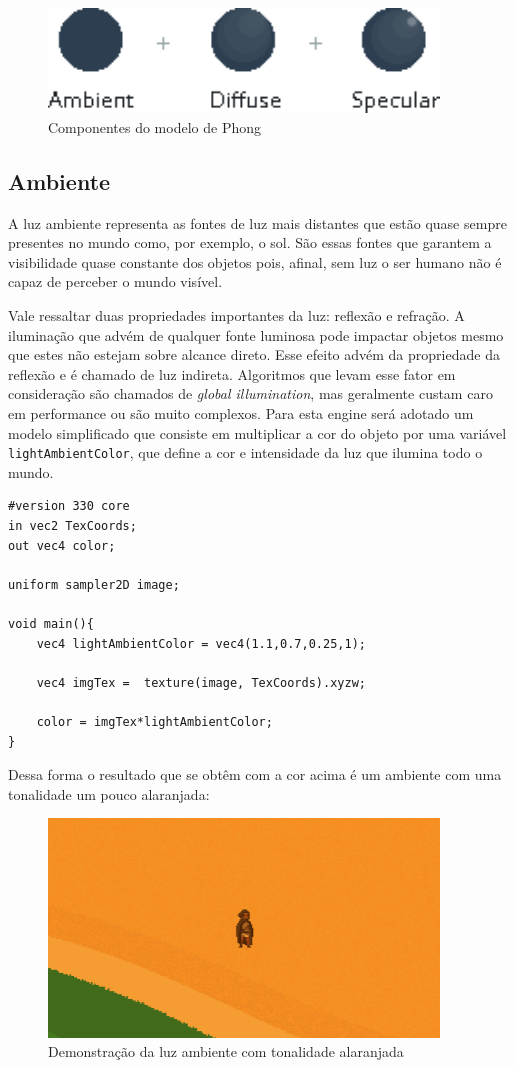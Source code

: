\documentclass[12pt, 
openright, 
oneside, 
a4paper,    
brazil]{facom-ufu-abntex2}
\begin{document}
\begin{figure}[H]
	\centering
	\includegraphics[width=28em]{imagens/lightning.png}
	\caption{Componentes do modelo de Phong}
\end{figure}


\subsection{Ambiente}
A luz ambiente representa as fontes de luz mais distantes que estão quase sempre presentes no mundo como, por exemplo, o sol. São essas fontes que garantem a visibilidade quase constante dos objetos pois, afinal, sem luz o ser humano não é capaz de perceber o mundo visível.

Vale ressaltar duas propriedades importantes da luz: reflexão e refração. A iluminação que advém de qualquer fonte luminosa pode impactar objetos mesmo que estes não estejam sobre alcance direto. Esse efeito advém da propriedade da reflexão e é chamado de luz indireta. Algoritmos que levam esse fator em consideração são chamados de \textit{global illumination}, mas geralmente custam caro em performance ou são muito complexos.
Para esta engine será adotado um modelo simplificado que consiste em multiplicar a cor do objeto por uma variável \texttt{lightAmbientColor}, que define a cor e intensidade da luz que ilumina todo o mundo.

\begin{lstlisting}[caption=Fragment Shader com luz ambiente]
#version 330 core
in vec2 TexCoords;
out vec4 color;

uniform sampler2D image;

void main(){
	vec4 lightAmbientColor = vec4(1.1,0.7,0.25,1);
	
	vec4 imgTex =  texture(image, TexCoords).xyzw;
	
	color = imgTex*lightAmbientColor;
}
\end{lstlisting}

Dessa forma o resultado que se obtêm com a cor acima é um ambiente com uma tonalidade um pouco alaranjada:

\begin{figure}[H]
	\centering
	\includegraphics[width=28em]{imagens/sunset.png}
	\caption{Demonstração da luz ambiente com tonalidade alaranjada}
\end{figure}
\end{document}
